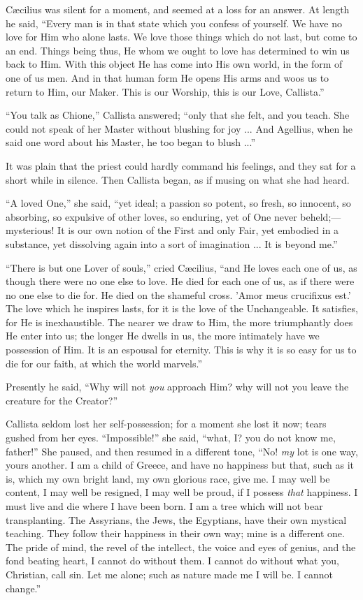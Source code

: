 Cæcilius was silent for a moment, and seemed at a loss for an
answer. At length he said, ``Every man is in that state which you
confess of yourself. We have no love for Him who alone lasts. We love
those things which do not last, but come to an end. Things being thus,
He whom we ought to love has determined to win us back to Him. With
this object He has come into His own world, in the form of one of us
men. And in that human form He opens His arms and woos us to return to
Him, our Maker. This is our Worship, this is our Love, Callista.''

``You talk as Chione,'' Callista answered; ``only that
she felt, and you teach. She could not speak of her Master without
blushing for joy ... And Agellius, when he said one word about his
Master, he too began to blush ...''

It was plain that the priest could hardly command his feelings, and
they sat for a short while in silence. Then Callista began, as if
musing on what she had heard.

``A loved One,'' she said, ``yet ideal; a passion so
potent, so fresh, so innocent, so absorbing, so expulsive of
other loves, so enduring, yet of One never beheld;—mysterious! It is
our own notion of the First and only Fair, yet embodied in a
substance, yet dissolving again into a sort of imagination ... It is
beyond me.''

``There is but one Lover of souls,'' cried Cæcilius,
``and He loves each one of us, as though there were no one else to
love. He died for each one of us, as if there were no one else to die
for. He died on the shameful cross. 'Amor meus crucifixus est.' The
love which he inspires lasts, for it is the love of the Unchangeable.
It satisfies, for He is inexhaustible. The nearer we draw to Him, the
more triumphantly does He enter into us; the longer He dwells in us,
the more intimately have we possession of Him. It is an espousal for
eternity. This is why it is so easy for us to die for our faith, at
which the world marvels.''

Presently he said, ``Why will not \emph{you} approach Him? why
will not you leave the creature for the Creator?''

Callista seldom lost her self-possession; for a moment she lost it
now; tears gushed from her eyes. ``Impossible!'' she said,
``what, I? you do not know me, father!'' She paused, and then
resumed in a different tone, ``No! \emph{my} lot is one way, yours
another. I am a child of Greece, and have no happiness but that, such
as it is, which my own bright land, my own glorious race, give me. I
may well be content, I may well be resigned, I may well be
proud, if I possess \emph{that} happiness. I must live and die where I
have been born. I am a tree which will not bear transplanting. The
Assyrians, the Jews, the Egyptians, have their own mystical teaching.
They follow their happiness in their own way; mine is a different one.
The pride of mind, the revel of the intellect, the voice and eyes of
genius, and the fond beating heart, I cannot do without them. I cannot
do without what you, Christian, call sin. Let me alone; such as nature
made me I will be. I cannot change.''

